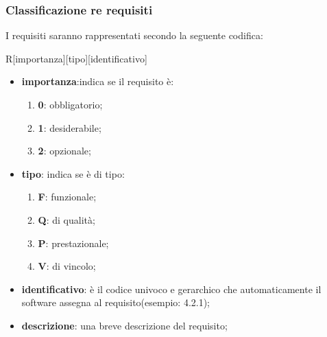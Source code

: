		\subsubsection{Classificazione  re requisiti}
		I requisiti saranno rappresentati secondo la seguente codifica:
		\begin{center}
			R[importanza][tipo][identificativo]
		\end{center}
		\begin{itemize}
			\item \textbf{importanza}:indica se il requisito è:
			\begin{enumerate}
				\item \textbf{0}: obbligatorio;
				\item \textbf{1}: desiderabile;
				\item \textbf{2}: opzionale;
			\end{enumerate}
			\item \textbf{tipo}: indica se è di tipo:
			\begin{enumerate}
				\item \textbf{F}: funzionale;
				\item \textbf{Q}: di qualità;
				\item \textbf{P}: prestazionale;
				\item \textbf{V}: di vincolo;
			\end{enumerate}
			\item \textbf{identificativo}: è il codice univoco e gerarchico che automaticamente il software assegna al requisito(esempio: 4.2.1);
			\item \textbf{descrizione}: una breve descrizione del requisito;
		\end{itemize}

